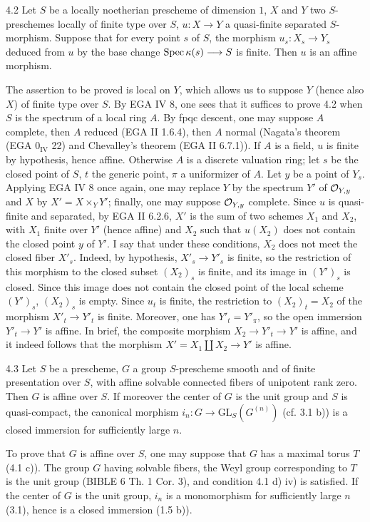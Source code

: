 \begin{lemma}{4.2}\label{XVI.4.2}
Let $S$ be a locally noetherian prescheme of dimension $1$, $X$ and $Y$ two $S$-preschemes locally of finite type over $S$, $u:X\to Y$ a quasi-finite separated $S$-morphism. Suppose that for every point $s$ of $S$, the morphism $u_s:X_s\to Y_s$ deduced from $u$ by the base change $\operatorname{Spec}\kappa(s)\longrightarrow S$ is finite. Then $u$ is an affine morphism.
\end{lemma}
The assertion to be proved is local on $Y$, which allows us to suppose $Y$ (hence also $X$) of finite type over $S$. By EGA IV 8, one sees that it suffices to prove 4.2 when $S$ is the spectrum of a local ring $A$. By fpqc descent, one may suppose $A$ complete, then $A$ reduced (EGA II 1.6.4), then $A$ normal (Nagata's theorem (EGA $0_{\mathrm{IV}}$ 22) and Chevalley's theorem (EGA II 6.7.1)). If $A$ is a field, $u$ is finite by hypothesis, hence affine. Otherwise $A$ is a discrete valuation ring; let $s$ be the closed point of $S$, $t$ the generic point, $\pi$ a uniformizer of $A$. Let $y$ be a point of $Y_s$. Applying EGA IV 8 once again, one may replace $Y$ by the spectrum $Y'$ of $\mathcal{O}_{Y,y}$ and $X$ by $X'=X\times_Y Y'$; finally, one may suppose $\mathcal{O}_{Y,y}$ complete. Since $u$ is quasi-finite and separated, by EGA II 6.2.6, $X'$ is the sum of two schemes $X_1$ and $X_2$, with $X_1$ finite over $Y'$ (hence affine) and $X_2$ such that $u(X_2)$ does not contain the closed point $y$ of $Y'$. I say that under these conditions, $X_2$ does not meet the closed fiber $X'_s$. Indeed, by hypothesis, $X'_s\to Y'_s$ is finite, so the restriction of this morphism to the closed subset $(X_2)_s$ is finite, and its image in $(Y')_s$ is closed. Since this image does not contain the closed point of the local scheme $(Y')_s$, $(X_2)_s$ is empty. Since $u_t$ is finite, the restriction to $(X_2)_t=X_2$ of the morphism $X'_t\to Y'_t$ is finite. Moreover, one has $Y'_t=Y'_\pi$, so the open immersion $Y'_t\to Y'$ is affine. In brief, the composite morphism $X_2\to Y'_t\to Y'$ is affine, and it indeed follows that the morphism $X'=X_1\coprod X_2\to Y'$ is affine.
\begin{corollary}{4.3}\label{XVI.4.3}
Let $S$ be a prescheme, $G$ a group $S$-prescheme smooth and of finite presentation over $S$, with affine solvable connected fibers of unipotent rank zero. Then $G$ is affine over $S$. If moreover the center of $G$ is the unit group and $S$ is quasi-compact, the canonical morphism $i_n:G\to\mathrm{GL}_S(G^{(n)})$ (cf. 3.1 b)) is a closed immersion for sufficiently large $n$.
\end{corollary}
To prove that $G$ is affine over $S$, one may suppose that $G$ has a maximal torus $T$ (4.1 c)). The group $G$ having solvable fibers, the Weyl group corresponding to $T$ is the unit group (BIBLE 6 Th. 1 Cor. 3), and condition 4.1 d) iv) is satisfied. If the center of $G$ is the unit group, $i_n$ is a monomorphism for sufficiently large $n$ (3.1), hence is a closed immersion (1.5 b)).

